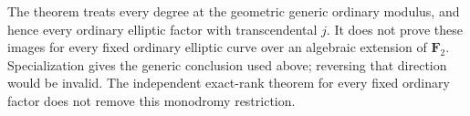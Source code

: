 \begin{remark}
\label{rem:generic-mixed-modulus-gate}
The theorem treats every degree at the geometric generic
ordinary modulus, and hence every ordinary elliptic factor
with transcendental $j$. It does not prove these images for
every fixed ordinary elliptic curve over an algebraic extension
of $\mathbf F_2$. Specialization gives the generic conclusion
used above; reversing that direction would be invalid.
The independent exact-rank theorem for every fixed ordinary
factor does not remove this monodromy restriction.
\end{remark}
